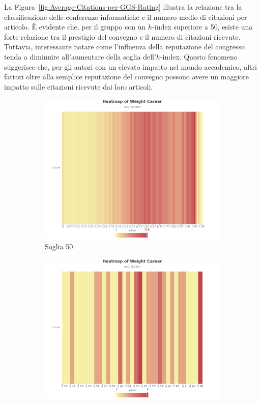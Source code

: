 La Figura~\ref{fig:Average-Citations-per-GGS-Rating} illustra la relazione tra la classificazione delle conferenze informatiche e il numero medio di citazioni per articolo. È evidente che, per il gruppo con un $h$-index superiore a 50, esiste una forte relazione tra il prestigio del convegno e il numero di citazioni ricevute. Tuttavia, interessante notare come l'influenza della reputazione del congresso tenda a diminuire all'aumentare della soglia dell'$h$-index. Questo fenomeno suggerisce che, per gli autori con un elevato impatto nel mondo accademico, altri fattori oltre alla semplice reputazione del convegno possono avere un maggiore impatto sulle citazioni ricevute dai loro articoli.

\begin{figure}[ht]
    \centering
    \begin{subfigure}{0.49\textwidth}
        \includegraphics[width=\textwidth]{images/Heatmap-of-Weight-Career-50.pdf}
        \caption{Soglia 50}
        \label{fig:Heatmap-of-Weight-Career-50}
    \end{subfigure}
    \hfill
    \begin{subfigure}{0.49\textwidth}
        \includegraphics[width=\textwidth]{images/Heatmap-of-Weight-Career-150.pdf}

\end{subfigure}
\end{figure}
